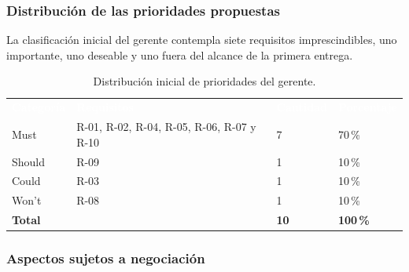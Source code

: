 \documentclass[12pt,a4paper]{article}
\newcommand{\cabecera}[1]{
    \textcolor{white}{\textbf{#1}}
}
\begin{document}
\endgroup

\subsubsection{Distribución de las prioridades propuestas}

La clasificación inicial del gerente contempla siete
requisitos imprescindibles, uno importante, uno deseable
y uno fuera del alcance de la primera entrega.

\begin{table}[htbp]

    \centering
    \small

    \begin{tabularx}{\textwidth}{
        L{3cm}
        Y
        C{1.8cm}
        C{2cm}
    }

        \cabecera{Categoría} &
        \cabecera{Requisitos} &
        \cabecera{Cantidad} &
        \cabecera{Porcentaje} \\

        Must &
        R-01, R-02, R-04, R-05, R-06, R-07 y R-10 &
        7 &
        70\,\% \\

        Should &
        R-09 &
        1 &
        10\,\% \\

        Could &
        R-03 &
        1 &
        10\,\% \\

        Won't &
        R-08 &
        1 &
        10\,\% \\

        \midrule

        \textbf{Total} &
        &
        \textbf{10} &
        \textbf{100\,\%} \\

        \bottomrule

    \end{tabularx}

    \caption{Distribución inicial de prioridades del gerente.}
    \label{tab:distribucion-gerente}

\end{table}

\subsubsection{Aspectos sujetos a negociación}
\end{document}
